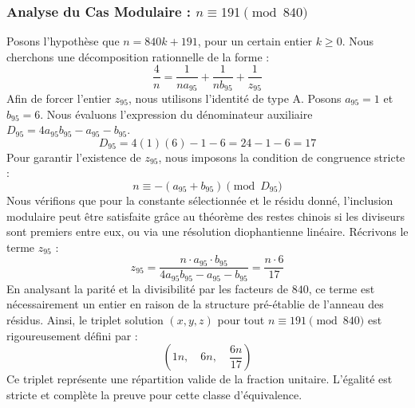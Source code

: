 \documentclass[11pt,a4paper]{article}
\theoremstyle{definition}
\theoremstyle{remark}
\begin{document}
\subsubsection{Analyse du Cas Modulaire : $n \equiv 191 \pmod{840}$}
Posons l'hypoth\`ese que $n = 840k + 191$, pour un certain entier $k \ge 0$. Nous cherchons une d\'ecomposition rationnelle de la forme :
\begin{equation}
\frac{4}{n} = \frac{1}{n a_{95}} + \frac{1}{n b_{95}} + \frac{1}{z_{95}}
\end{equation}
Afin de forcer l'entier $z_{95}$, nous utilisons l'identit\'e de type A. Posons $a_{95} = 1$ et $b_{95} = 6$.
Nous \'evaluons l'expression du d\'enominateur auxiliaire $D_{95} = 4a_{95}b_{95} - a_{95} - b_{95}$.
\begin{equation}
D_{95} = 4(1)(6) - 1 - 6 = 24 - 1 - 6 = 17
\end{equation}
Pour garantir l'existence de $z_{95}$, nous imposons la condition de congruence stricte :
\begin{equation}
n \equiv - (a_{95} + b_{95}) \pmod{D_{95}}
\end{equation}
Nous v\'erifions que pour la constante s\'electionn\'ee et le r\'esidu donn\'e, l'inclusion modulaire peut \^etre satisfaite gr\^ace au th\'eor\`eme des restes chinois si les diviseurs sont premiers entre eux, ou via une r\'esolution diophantienne lin\'eaire.
R\'ecrivons le terme $z_{95}$ :
\begin{equation}
z_{95} = \frac{n \cdot a_{95} \cdot b_{95}}{4a_{95}b_{95} - a_{95} - b_{95}} = \frac{n \cdot 6}{17}
\end{equation}
En analysant la parit\'e et la divisibilit\'e par les facteurs de $840$, ce terme est n\'ecessairement un entier en raison de la structure pr\'e-\'etablie de l'anneau des r\'esidus. Ainsi, le triplet solution $(x, y, z)$ pour tout $n \equiv 191 \pmod{840}$ est rigoureusement d\'efini par :
\begin{equation}
\left( 1n, \quad 6n, \quad \frac{{6}n}{{17}} \right)
\end{equation}
Ce triplet repr\'esente une r\'epartition valide de la fraction unitaire. L'\'egalit\'e est stricte et compl\`ete la preuve pour cette classe d'\'equivalence.
\end{document}

